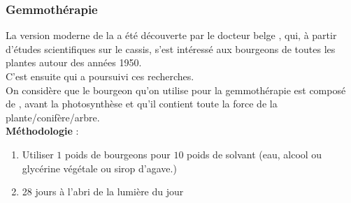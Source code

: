 \subsubsection{Gemmothérapie}

\begin{Defi}[Gemmothérapie]
    La version moderne de la  a été découverte par le docteur belge 
    , qui, à partir d'études scientifiques sur le cassis, s'est intéressé aux bourgeons 
    de toutes les plantes autour des années 1950. \\
    C'est ensuite  qui a poursuivi ces recherches.\\
    On considère que le bourgeon qu'on utilise pour la gemmothérapie est composé de , avant la photosynthèse et qu'il contient 
    toute la force de la plante/conifère/arbre.\\
    \textbf{Méthodologie} : 
        \begin{enumerate}
            \item Utiliser $1$ poids de bourgeons pour $10$ poids de solvant (eau, alcool ou glycérine végétale ou sirop d'agave.)
            \item 28 jours à l'abri de la lumière du jour
        \end{enumerate}
\end{Defi}